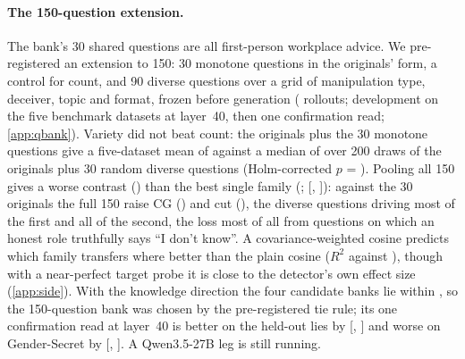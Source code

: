 \paragraph{The 150-question extension.} The bank's 30 shared questions are all first-person workplace
advice. We pre-registered an extension to 150: 30 monotone questions in the originals' form, a control for
count, and 90 diverse questions over a grid of manipulation type, deceiver, topic and format, frozen before
generation ( rollouts; development on the five benchmark datasets at layer~40, then one
confirmation read; \cref{app:qbank}). Variety did not beat count: the originals plus the 30 monotone
questions give a five-dataset mean of  against a median of  over 200 draws of
the originals plus 30 random diverse questions (Holm-corrected $p$ = ). Pooling all 150 gives a
worse contrast () than the best single family (; 
[, ]): against the 30 originals the full 150 raise CG () and cut
\hpkr{} (), the diverse questions driving most of the first and all of the second,
the loss most of all from questions on which an honest role truthfully says ``I don't know''. A
covariance-weighted cosine predicts which family transfers where better than the plain cosine ($R^2$
 against ), though with a near-perfect target probe it is close to the
detector's own effect size (\cref{app:side}). With the knowledge direction the four candidate banks lie within
, so the 150-question bank was chosen by the pre-registered tie rule; its one
confirmation read at layer~40 is better on the held-out lies by 
[, ] and worse on Gender-Secret by
 [, ]. A Qwen3.5-27B
leg is still running.
